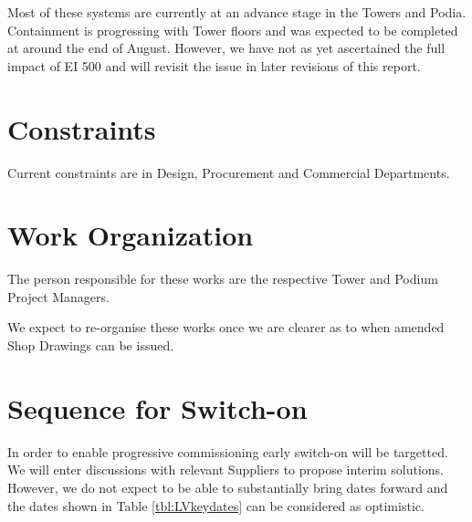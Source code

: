 Most of these systems are currently at an advance stage in the Towers and Podia. Containment is progressing with Tower floors and was expected to be completed at around the end of August. However, we have not as yet ascertained the full impact of EI 500 and will revisit the issue in later revisions of this report.

\section{Constraints}

Current constraints are in Design, Procurement and Commercial Departments. 

\ramadaneffect
 

\section{Work Organization}

The person responsible for these works are the respective Tower and Podium Project Managers. 

We expect to re-organise these works once we are clearer as to when amended Shop Drawings can be issued.   

\section{Sequence for Switch-on}

In order to enable progressive commissioning early switch-on will be targetted. We will enter discussions with relevant Suppliers to propose interim solutions. However, we do not expect to be able to substantially bring dates forward and the dates shown in Table \ref{tbl:LVkeydates} can be considered as optimistic.










